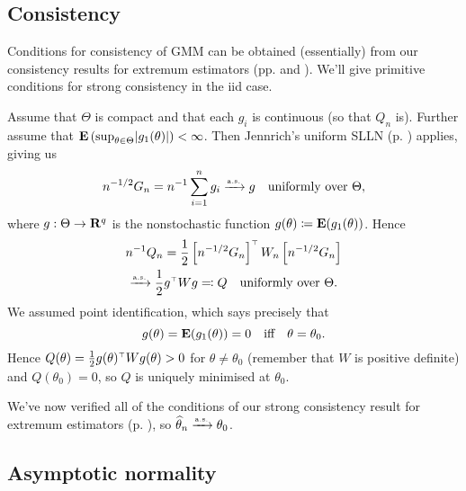 \documentclass[11pt,letterpaper,reqno,oneside]{article}
\begin{document}
\subsection{Consistency}
\label{sec:GMM:consistency}

Conditions for consistency of GMM can be obtained (essentially) from our consistency results for extremum estimators (pp. \pageref{proposition:weak_consistency} and \pageref{proposition:strong_consistency}). We'll give primitive conditions for strong consistency in the iid case.

Assume that $\Theta$ is compact and that each $g_i$ is continuous (so that $Q_n$ is). Further assume that $\E\left( \sup_{\theta \in \Theta} \abs*{g_1(\theta)} \right) < \infty$. Then Jennrich's uniform SLLN (p. \pageref{theorem:Jennrich_uniform_SLLN}) applies, giving us
%
\begin{equation*}
	n^{-1/2} G_n 
	= n^{-1} \sum_{i=1}^n g_i
	\xrightarrow{{\scriptscriptstyle \mathrm{a.s.}}} g
	\quad\text{uniformly over $\Theta$} ,
\end{equation*}
%
where $g : \Theta \to \mathbf{R}^q$ is the nonstochastic function $g(\theta) \coloneqq \mathbf{E}( g_1(\theta) )$. Hence
%
\begin{multline*}
	n^{-1} Q_n 
	= \frac{1}{2} \left[ n^{-1/2} G_n \right]^{\scriptscriptstyle \top} W_n \left[ n^{-1/2} G_n \right]
	\\
	\xrightarrow{{\scriptscriptstyle \mathrm{a.s.}}} \frac{1}{2} g^{\scriptscriptstyle \top} W g \eqqcolon Q
	\quad\text{uniformly over $\Theta$} .
\end{multline*}
%
We assumed point identification, which says precisely that
%
\begin{equation*}
	g(\theta) = \mathbf{E}( g_1(\theta) ) = 0
	\quad\text{iff}\quad
	\theta = \theta_0 .
\end{equation*}
%
Hence $Q(\theta) = \frac{1}{2} g(\theta)^{\scriptscriptstyle \top} W g(\theta) > 0$ for $\theta \neq \theta_0$ (remember that $W$ is positive definite) and $Q(\theta_0)=0$, so $Q$ is uniquely minimised at $\theta_0$.

We've now verified all of the conditions of our strong consistency result for extremum estimators (p. \pageref{proposition:strong_consistency}), so $\widehat{\theta}_n \xrightarrow{{\scriptscriptstyle \mathrm{a.s.}}} \theta_0$.



\subsection{Asymptotic normality}
\label{sec:GMM:asymptotic_normality}
\end{document}
